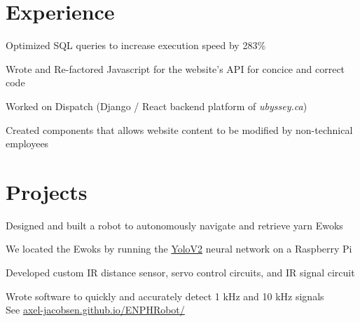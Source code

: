 \documentclass[]{deedy-resume-openfont}
\begin{document}

\section{Experience}

\begin{tightemize}
	\item Optimized SQL queries to increase execution speed by 283\%
	\item Wrote and Re-factored Javascript for the website’s API for concice and correct code
\end{tightemize}
\sectionsep

\begin{tightemize}
	\item Worked on Dispatch (Django / React backend platform of \textit{ubyssey.ca})
    \item Created components that allows website content to be modified by non-technical employees
    \vspace{15pt}
\end{tightemize}
\sectionsep

\section{Projects}

\begin{tightemize}
	\item Designed and built a robot to autonomously navigate and retrieve yarn Ewoks
	\item We located the Ewoks by running the \href{https://pjreddie.com/darknet/yolov2/}{YoloV2} neural network on a Raspberry Pi
	\item Developed custom IR distance sensor, servo control circuits, and IR signal circuit
	\item Wrote software to quickly and accurately detect 1 kHz and 10 kHz signals \\
	See \href{https://axel-jacobsen.github.io/ENPHRobot/}{axel-jacobsen.github.io/ENPHRobot/}
\end{tightemize}
\sectionsep
\end{document}
